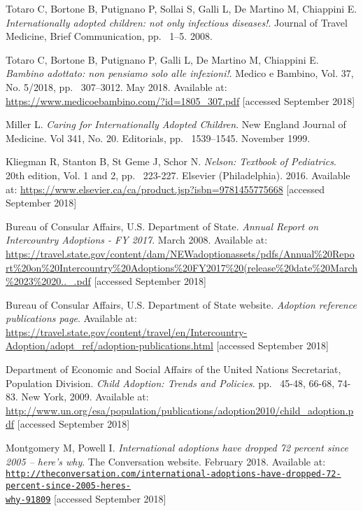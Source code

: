 
\begin{thebibliography}{50}

  Totaro C, Bortone B, Putignano P, Sollai S, Galli L, De Martino M, Chiappini E.
  \textit{Internationally adopted children: not only infectious diseases!}.
  Journal of Travel Medicine,
  Brief Communication,
  pp. ~1–5.
  2008.
  
  Totaro C, Bortone B, Putignano P, Galli L, De Martino M, Chiappini E.
  \textit{Bambino adottato: non pensiamo solo alle infezioni!}.
  Medico e Bambino, Vol. 37, No. 5/2018,
  pp. ~307–3012.
  May 2018.
  Available at: \url{https://www.medicoebambino.com/?id=1805_307.pdf} [accessed September 2018]
  
  Miller L.
  \textit{Caring for Internationally Adopted Children}.
  New England Journal of Medicine. Vol 341, No. 20.
  Editorials,
  pp. ~1539–1545.
  November 1999.

  Kliegman R, Stanton B, St Geme J, Schor N.
  \textit{Nelson: Textbook of Pediatrics}.
  20th edition, Vol. 1 and 2,
  pp. ~223-227.
  Elsevier (Philadelphia).
  2016.
  Available at: \url{https://www.elsevier.ca/ca/product.jsp?isbn=9781455775668} [accessed September 2018]
  
  Bureau of Consular Affairs, U.S. Department of State.
  \textit{Annual Report on Intercountry Adoptions - FY 2017}.
  March 2008.
  Available at: \url{https://travel.state.gov/content/dam/NEWadoptionassets/pdfs/Annual%20Report%20on%20Intercountry%20Adoptions%20FY2017%20(release%20date%20March%2023%2020.._.pdf} [accessed September 2018]
  
  Bureau of Consular Affairs, U.S. Department of State website.
  \textit{Adoption reference publications page}.
  Available at: \url{https://travel.state.gov/content/travel/en/Intercountry-Adoption/adopt_ref/adoption-publications.html} [accessed September 2018]  
  
  Department of Economic and Social Affairs of the United Nations Secretariat, Population Division.
  \textit{Child Adoption: Trends and Policies}.
  pp. ~45-48, 66-68, 74-83.
  New York,
  2009.
  Available at: \url{http://www.un.org/esa/population/publications/adoption2010/child_adoption.pdf} [accessed September 2018]

  Montgomery M, Powell I.
  \textit{International adoptions have dropped 72 percent since 2005 – here’s why}.
  The Conversation website.
  February 2018.
  Available at: \href{http://theconversation.com/international-adoptions-have-dropped-72-percent-since-2005-heres-why-91809}{\nolinkurl{http://theconversation.com/international-adoptions-have-dropped-72-percent-since-2005-heres-}
  \\
  \nolinkurl{why-91809}} [accessed September 2018]
  

\end{thebibliography}
